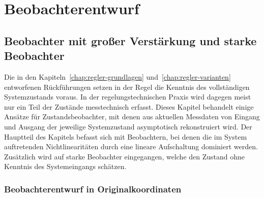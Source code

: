 
\part{Beobachterentwurf\label{part:Beobachterentwurf}}

\chapter{Beobachter mit großer Verstärkung und starke Beobachter\label{chap:High-Gain-Beobachter}}

Die in den Kapiteln~\ref{chap:regler-grundlagen} und~\ref{chap:regler-varianten}
entworfenen Rückführungen setzen in der Regel die Kenntnis des vollständigen
Systemzustands voraus. In der regelungstechnischen Praxis wird dagegen
meist nur ein Teil der Zustände messtechnisch erfasst. Dieses Kapitel
behandelt einige Ansätze für Zustandsbeobachter, mit denen aus aktuellen
Messdaten von Eingang und Ausgang der jeweilige Systemzustand asymptotisch
rekonstruiert wird. Der Hauptteil des Kapitels befasst sich mit Beobachtern,
bei denen die im System auftretenden Nichtlinearitäten durch eine
lineare Aufschaltung dominiert werden. Zusätzlich wird auf starke
Beobachter eingegangen, welche den Zustand ohne Kenntnis des Systemeingangs
schätzen.

\section{Beobachterentwurf in Originalkoordinaten}

